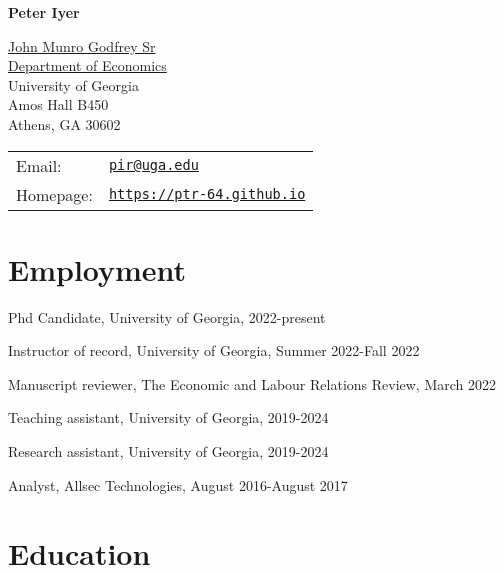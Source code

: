 \documentclass[letterpaper]{article}
\def\name{Peter Iyer}
\renewenvironment{itemize}{
  \begin{list}{}{
    \setlength{\leftmargin}{1.5em}
  }
}{
  \end{list}
}
\begin{document}

\centerline{\huge \bf \name}

\vspace{0.25in}

\begin{minipage}{0.45\linewidth}
  \href{}{John Munro Godfrey Sr \\Department of Economics} \\
  University of Georgia \\
  Amos Hall B450 \\
  Athens, GA 30602
\end{minipage}
\begin{minipage}{0.45\linewidth}
  \begin{tabular}{ll}
    Email:    & \href{mailto:pir@uga.edu}{\tt pir@uga.edu} \\
    Homepage: & \href{https://ptr-64.github.io/}{\tt https://ptr-64.github.io}
  \end{tabular}
\end{minipage}


\section*{Employment}
\begin{itemize}
    \item Phd Candidate, University of Georgia, 2022-present
      \item Instructor of record, University of Georgia, Summer 2022-Fall 2022
        \item Manuscript reviewer, The Economic and Labour Relations Review, March 2022
          \item Teaching assistant, University of Georgia, 2019-2024
            \item Research assistant, University of Georgia, 2019-2024
              \item Analyst, Allsec Technologies, August 2016-August 2017
\end{itemize}


\section*{Education}
\end{document}
